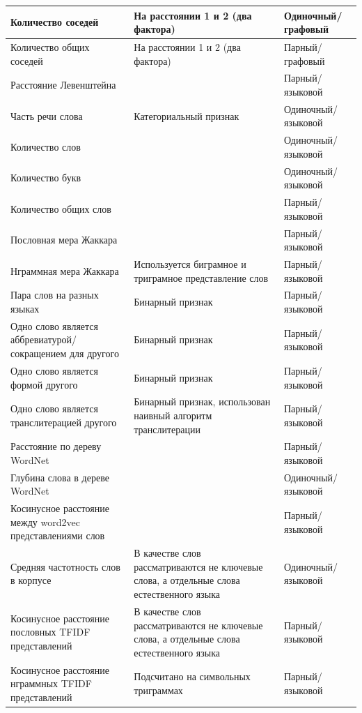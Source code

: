 \begin{tabularx}{16cm}{|X|X|X|}
        Количество соседей & На расстоянии 1 и 2 (два фактора) & Одиночный/графовый \\ \hline
        Количество общих соседей & На расстоянии 1 и 2 (два фактора) & Парный/графовый \\ \hline
        Расстояние Левенштейна & & Парный/языковой \\ \hline
        Часть речи слова & Категориальный признак & Одиночный/языковой \\ \hline
        Количество слов  & & Одиночный/языковой \\ \hline
        Количество букв & & Одиночный/языковой \\ \hline
        Количество общих слов & & Парный/языковой \\ \hline
        Пословная мера Жаккара & & Парный/языковой \\ \hline
        Нграммная мера Жаккара & Используется биграмное и триграмное представление слов & Парный/языковой \\ \hline
        Пара слов на разных языках & Бинарный признак & Парный/языковой \\ \hline
        Одно слово является аббревиатурой/сокращением  для другого & Бинарный признак & Парный/языковой \\ \hline
        Одно слово является формой другого & Бинарный признак & Парный/языковой \\ \hline
        Одно слово является транслитерацией другого & Бинарный признак, использован наивный алгоритм транслитерации & Парный/языковой \\ \hline
        Расстояние по дереву WordNet & & Парный/языковой \\ \hline
        Глубина слова в дереве WordNet & & Одиночный/языковой \\ \hline
        Косинусное расстояние между word2vec представлениями слов & & Парный/языковой \\ \hline
        Средняя частотность слов в корпусе & В качестве слов рассматриваются не ключевые слова, а отдельные слова естественного языка  & Одиночный/языковой \\ \hline
        Косинусное расстояние пословных TFIDF представлений & В качестве слов рассматриваются не ключевые слова, а отдельные слова естественного языка & Парный/языковой \\ \hline
        Косинусное расстояние нграммных TFIDF представлений & Подсчитано на символьных триграммах & Парный/языковой \\ \hline

\end{tabularx}


